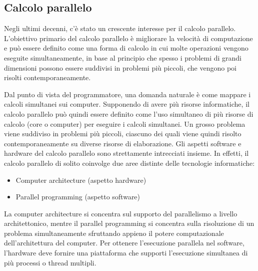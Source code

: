 \subsection{Calcolo parallelo}
Negli ultimi decenni, c'è stato un crescente interesse per il calcolo parallelo. L'obiettivo primario del calcolo parallelo è migliorare la velocità di computazione e può essere definito come una forma di calcolo in cui molte operazioni vengono eseguite simultaneamente, in base al principio che spesso i problemi di grandi dimensioni possono essere suddivisi in problemi più piccoli, che vengono poi risolti contemporaneamente.

Dal punto di vista del programmatore, una domanda naturale è come mappare i calcoli simultanei sui computer. Supponendo di avere più risorse informatiche, il calcolo parallelo può quindi essere definito come l'uso simultaneo di più risorse di calcolo (core o computer) per eseguire i calcoli simultanei. Un grosso problema viene suddiviso in problemi più piccoli, ciascuno dei quali viene quindi risolto contemporaneamente su diverse risorse di elaborazione. Gli aspetti software e hardware del calcolo parallelo sono strettamente intrecciati insieme. In effetti, il calcolo parallelo di solito coinvolge due aree distinte delle tecnologie informatiche:
\begin{itemize}
	\item Computer architecture (aspetto hardware)
	\item Parallel programming (aspetto software)
\end{itemize}
La computer architecture si concentra sul supporto del parallelismo a livello architettonico, mentre il parallel programming si concentra sulla risoluzione di un problema simultaneamente sfruttando appieno il potere computazionale dell'architettura del computer. Per ottenere l'esecuzione parallela nel software, l'hardware deve fornire una piattaforma che supporti l'esecuzione simultanea di più processi o thread multipli.

